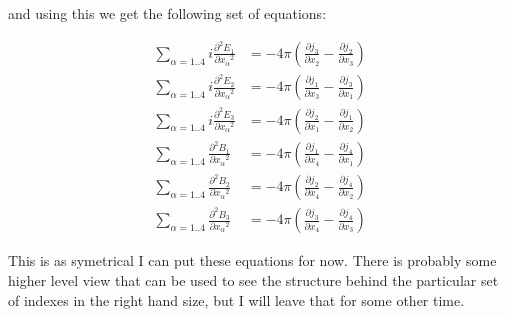 \documentclass{article}      %
\newcommand{\D}[2] {\frac {\partial #2} {\partial #1}}
\newcommand{\Dsq}[2] {\frac {\partial^2 #2} {\partial {#1}^2}}
\begin{document}
and using this we get the following set of equations:

\begin{align*}
\sum_{\alpha = 1 .. 4}{i \Dsq{x_\alpha}{E_1}} &= - 4\pi (\D{x_2}{j_3} - \D{x_3}{j_2}) \\
\sum_{\alpha = 1 .. 4}{i \Dsq{x_\alpha}{E_2}} &= - 4\pi (\D{x_3}{j_1} - \D{x_1}{j_3}) \\
\sum_{\alpha = 1 .. 4}{i \Dsq{x_\alpha}{E_3}} &= - 4\pi (\D{x_1}{j_2} - \D{x_2}{j_1}) \\
\sum_{\alpha = 1 .. 4}{\Dsq{x_\alpha}{B_1}} &= - 4\pi (\D{x_4}{j_1} - \D{x_1}{j_4})\\
\sum_{\alpha = 1 .. 4}{\Dsq{x_\alpha}{B_2}} &= - 4\pi (\D{x_4}{j_2} - \D{x_2}{j_4})\\
\sum_{\alpha = 1 .. 4}{\Dsq{x_\alpha}{B_3}} &= - 4\pi (\D{x_4}{j_3} - \D{x_3}{j_4})
\end{align*}

This is as symetrical I can put these equations for now.  There is probably some higher level 
view that can be used to see the structure behind the particular set of indexes in the right 
hand size, but I will leave that for some other time.
\end{document}
